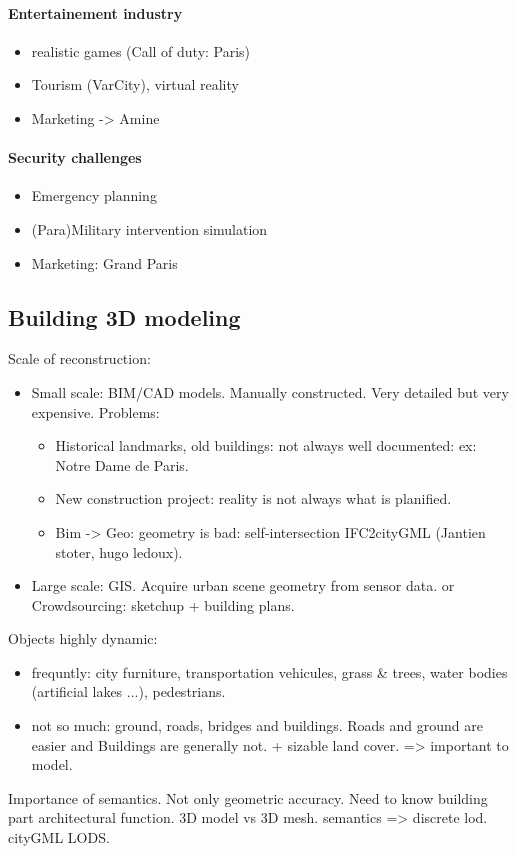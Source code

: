         \paragraph{Entertainement industry}
        \begin{itemize}
            \item realistic games (Call of duty: Paris)
            \item Tourism (VarCity), virtual reality
            \item Marketing -> Amine
        \end{itemize}
        \paragraph{Security challenges}
        \begin{itemize}
            \item Emergency planning
            \item (Para)Military intervention simulation
            \item Marketing: Grand Paris
        \end{itemize}
    \subsection{Building 3D modeling}
        Scale of reconstruction:
        \begin{itemize}
            \item Small scale: BIM/CAD models. Manually constructed. Very detailed but very expensive. Problems:
            \begin{itemize}
                \item Historical landmarks, old buildings: not always well documented: ex: Notre Dame de Paris.
                \item New construction project: reality is not always what is planified.
                \item Bim -> Geo: geometry is bad: self-intersection IFC2cityGML (Jantien stoter, hugo ledoux).
            \end{itemize}
            \item Large scale: GIS. Acquire urban scene geometry from sensor data. or Crowdsourcing: sketchup + building plans.
        \end{itemize}
        Objects highly dynamic:
        \begin{itemize}
            \item frequntly: city furniture, transportation vehicules, grass \& trees, water bodies (artificial lakes ...), pedestrians.
            \item not so much: ground, roads, bridges and buildings. Roads and ground are easier and Buildings are generally not. + sizable land cover. => important to model.\\
        \end{itemize}
        Importance of semantics. Not only geometric accuracy. Need to know building part architectural function. 3D model vs 3D mesh.
        semantics => discrete lod. cityGML LODS.\\
